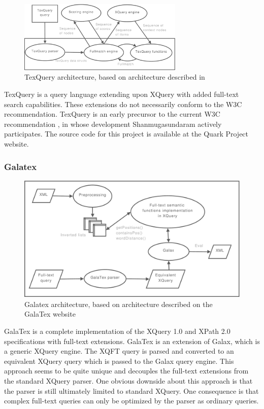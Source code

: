 \begin{figure}[!h]
  \centering
    \includegraphics[width=0.7\textwidth]{diagrams/texquery_arch}
  \caption[TexQuery architecture]{TexQuery architecture, based on architecture described in
  \cite{texquery_fulltextsearch}}
\end{figure}

TexQuery is a query language extending upon XQuery with added full-text search 
capabilities. These extensions do not necessarily conform to the W3C
recommendation. TexQuery is an early precursor to the current W3C 
recommendation \cite{TEXQ00}, in whose development Shanmugasundaram actively 
participates. The source code for this project is available at the Quark Project
website\cite{quarkproject}.

\subsubsection{Galatex}
\begin{figure}[!h]
  \centering
    \includegraphics[width=1\textwidth]{diagrams/galatex_arch}
  \caption[GalaTex architecture]{Galatex architecture, based on architecture described on
  the GalaTex website\cite{galatex}}
\end{figure}

GalaTex is a complete implementation of the XQuery 1.0 and XPath 2.0
specifications with full-text extensions. GalaTex is an extension of Galax,
which is a generic XQuery engine. The XQFT query is parsed and converted to an
equivalent XQuery query which is passed to the Galax query engine. This
approach seems to be quite unique and decouples the full-text extensions from
the standard XQuery parser. One obvious downside about this approach is
that the parser is still ultimately limited to standard XQuery. One consequence
is that complex full-text queries can only be optimized by the parser as
ordinary queries.

